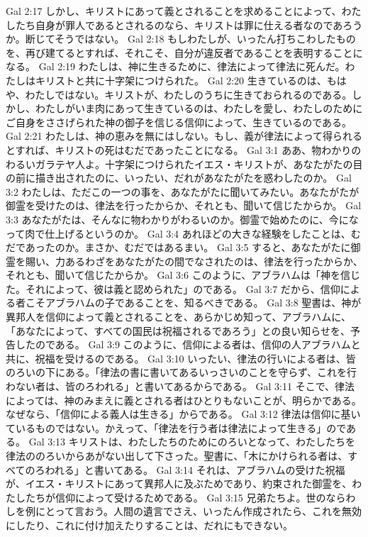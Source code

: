 Gal 2:17  しかし、キリストにあって義とされることを求めることによって、わたしたち自身が罪人であるとされるのなら、キリストは罪に仕える者なのであろうか。断じてそうではない。
Gal 2:18  もしわたしが、いったん打ちこわしたものを、再び建てるとすれば、それこそ、自分が違反者であることを表明することになる。
Gal 2:19  わたしは、神に生きるために、律法によって律法に死んだ。わたしはキリストと共に十字架につけられた。
Gal 2:20  生きているのは、もはや、わたしではない。キリストが、わたしのうちに生きておられるのである。しかし、わたしがいま肉にあって生きているのは、わたしを愛し、わたしのためにご自身をささげられた神の御子を信じる信仰によって、生きているのである。
Gal 2:21  わたしは、神の恵みを無にはしない。もし、義が律法によって得られるとすれば、キリストの死はむだであったことになる。
Gal 3:1  ああ、物わかりのわるいガラテヤ人よ。十字架につけられたイエス・キリストが、あなたがたの目の前に描き出されたのに、いったい、だれがあなたがたを惑わしたのか。
Gal 3:2  わたしは、ただこの一つの事を、あなたがたに聞いてみたい。あなたがたが御霊を受けたのは、律法を行ったからか、それとも、聞いて信じたからか。
Gal 3:3  あなたがたは、そんなに物わかりがわるいのか。御霊で始めたのに、今になって肉で仕上げるというのか。
Gal 3:4  あれほどの大きな経験をしたことは、むだであったのか。まさか、むだではあるまい。
Gal 3:5  すると、あなたがたに御霊を賜い、力あるわざをあなたがたの間でなされたのは、律法を行ったからか、それとも、聞いて信じたからか。
Gal 3:6  このように、アブラハムは「神を信じた。それによって、彼は義と認められた」のである。
Gal 3:7  だから、信仰による者こそアブラハムの子であることを、知るべきである。
Gal 3:8  聖書は、神が異邦人を信仰によって義とされることを、あらかじめ知って、アブラハムに、「あなたによって、すべての国民は祝福されるであろう」との良い知らせを、予告したのである。
Gal 3:9  このように、信仰による者は、信仰の人アブラハムと共に、祝福を受けるのである。
Gal 3:10  いったい、律法の行いによる者は、皆のろいの下にある。「律法の書に書いてあるいっさいのことを守らず、これを行わない者は、皆のろわれる」と書いてあるからである。
Gal 3:11  そこで、律法によっては、神のみまえに義とされる者はひとりもないことが、明らかである。なぜなら、「信仰による義人は生きる」からである。
Gal 3:12  律法は信仰に基いているものではない。かえって、「律法を行う者は律法によって生きる」のである。
Gal 3:13  キリストは、わたしたちのためにのろいとなって、わたしたちを律法ののろいからあがない出して下さった。聖書に、「木にかけられる者は、すべてのろわれる」と書いてある。
Gal 3:14  それは、アブラハムの受けた祝福が、イエス・キリストにあって異邦人に及ぶためであり、約束された御霊を、わたしたちが信仰によって受けるためである。
Gal 3:15  兄弟たちよ。世のならわしを例にとって言おう。人間の遺言でさえ、いったん作成されたら、これを無効にしたり、これに付け加えたりすることは、だれにもできない。
